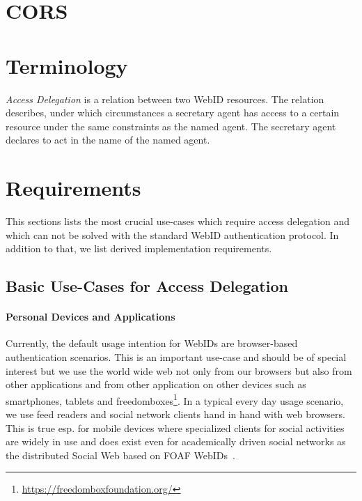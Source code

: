 \documentclass[a4paper]{llncs}
\begin{document}
\section{CORS}



\cite{story-h-2009--a}
\cite{tramp-s-2012--a}


\section{Terminology}



\textit{Access Delegation} is a relation between two WebID resources.
The relation describes, under which circumstances a secretary agent has access to a certain resource under the same constraints as the named agent.
The secretary agent declares to act in the name of the named agent.

\section{Requirements}

This sections lists the most crucial use-cases which require access delegation and which can not be solved with the standard WebID authentication protocol.
In addition to that, we list derived implementation requirements.

\subsection{Basic Use-Cases for Access Delegation}\label{sec:usecases}

\paragraph{Personal Devices and Applications}

Currently, the default usage intention for WebIDs are browser-based authentication scenarios.
This is an important use-case and should be of special interest but we use the world wide web not only from our browsers but also from other applications and from other application on other devices such as smartphones, tablets and freedomboxes\footnote{\url{https://freedomboxfoundation.org/}}.
In a typical every day usage scenario, we use feed readers and social network clients hand in hand with web browsers.
This is true esp. for mobile devices where specialized clients for social activities are widely in use and does exist even for academically driven social networks as the distributed Social Web  %
 based on FOAF WebIDs~\cite{tramp-s-2011--a}.
\end{document}
